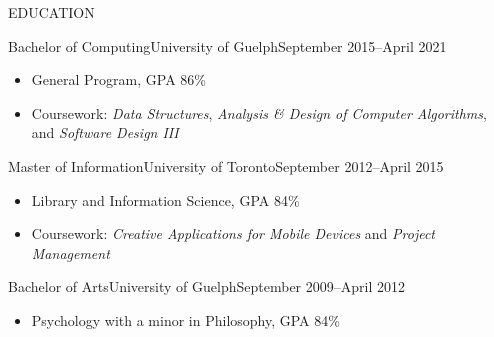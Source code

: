 \documentclass[]{mcdowellcv}
\begin{document}
	\makeheader
	
	\begin{cvsection}{EDUCATION}
		\begin{cvsubsection}{Bachelor of Computing}{University of Guelph}{September 2015--April 2021}
			\begin{itemize}
				\item General Program, GPA 86\%
				\item Coursework: \textit{Data Structures}, \textit{Analysis \& Design of Computer Algorithms}, and \textit{Software Design III}
			\end{itemize}
		\end{cvsubsection}

		\begin{cvsubsection}{Master of Information}{University of Toronto}{September 2012--April 2015}
			\begin{itemize}
				\item Library and Information Science, GPA 84\%
  			\item Coursework: \textit{Creative Applications for Mobile Devices} and \textit{Project Management}
			\end{itemize}
		\end{cvsubsection}

		\begin{cvsubsection}{Bachelor of Arts}{University of Guelph}{September 2009--April 2012}
			\begin{itemize}
				\item Psychology with a minor in Philosophy, GPA 84\%
			\end{itemize}
		\end{cvsubsection}
	\end{cvsection}
\end{document}
